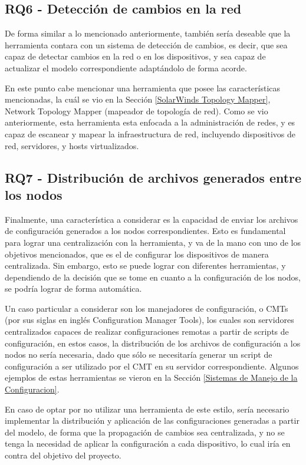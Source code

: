 \subsection{RQ6 - Detección de cambios en la red} \label{RQ6}
De forma similar a lo mencionado anteriormente, también sería deseable que la herramienta contara con un sistema de detección de cambios, es decir, que sea capaz de detectar cambios en la red o en los dispositivos, y sea capaz de actualizar el modelo correspondiente adaptándolo de forma acorde.

En este punto cabe mencionar una herramienta que posee las características mencionadas, la cuál se vio en la Sección \ref{SolarWinds Topology Mapper}, Network Topology Mapper (mapeador de topología de red). Como se vio anteriormente, esta herramienta esta enfocada a la administración de redes, y es capaz de escanear y mapear la infraestructura de red, incluyendo dispositivos de red, servidores, y hosts virtualizados.

\subsection{RQ7 - Distribución de archivos generados entre los nodos} \label{RQ7}
Finalmente, una característica a considerar es la capacidad de enviar los archivos de configuración generados a los nodos correspondientes. Esto es fundamental para lograr una centralización con la herramienta, y va de la mano con uno de  los objetivos mencionados, que es el de configurar los dispositivos de manera centralizada. Sin embargo, esto se puede lograr con diferentes herramientas, y dependiendo de la decisión que se tome en cuanto a la configuración de los nodos, se podría lograr de forma automática. 

Un caso particular a considerar son los manejadores de configuración, o CMTs (por sus siglas en inglés Configuration Manager Tools), los cuales son servidores centralizados capaces de realizar configuraciones remotas a partir de scripts de configuración, en estos casos, la distribución de los archivos de configuración a los nodos no sería necesaria, dado que sólo se necesitaría generar un script de configuración a ser utilizado por el CMT en su servidor correspondiente. Algunos ejemplos de estas herramientas se vieron en la Sección \ref{Sistemas de Manejo de la Configuracion}.

En caso de optar por no utilizar una herramienta de este estilo, sería necesario implementar la distribución y aplicación de las configuraciones generadas a partir del modelo, de forma que la propagación de cambios sea centralizada, y no se tenga la necesidad de aplicar la configuración a cada dispositivo, lo cual iría en contra del objetivo del proyecto.


